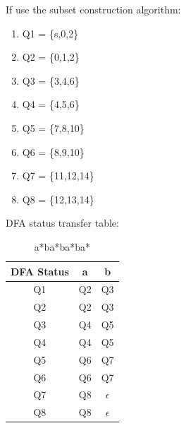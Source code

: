 \documentclass{article}
\begin{document}
            If use the subset construction algorithm:
            \begin{enumerate}[\qquad 1. ]
                \item Q1 = \{s,0,2\}
                \item Q2 = \{0,1,2\}
                \item Q3 = \{3,4,6\}
                \item Q4 = \{4,5,6\}
                \item Q5 = \{7,8,10\}
                \item Q6 = \{8,9,10\}
                \item Q7 = \{11,12,14\}
                \item Q8 = \{12,13,14\}
            \end{enumerate}

            DFA status transfer table:
                
                \begin{table}[!htbp]
                    \centering
                    \caption{a*ba*ba*ba*}
                    \label{tab:aStrangeTable}
                    \begin{tabular}{ccc}
                        \hline
                        DFA Status  & a     & b     \\
                        \hline
                        Q1          & Q2    & Q3    \\
                        \hline
                        Q2          & Q2    & Q3    \\
                        \hline
                        Q3          & Q4    & Q5    \\
                        \hline
                        Q4          & Q4    & Q5    \\
                        \hline
                        Q5          & Q6    & Q7    \\
                        \hline
                        Q6          & Q6    & Q7    \\
                        \hline
                        Q7          & Q8    & $\epsilon$ \\
                        \hline
                        Q8          & Q8    & $\epsilon$ \\
                        \hline
                    \end{tabular}
                \end{table}
\end{document}
